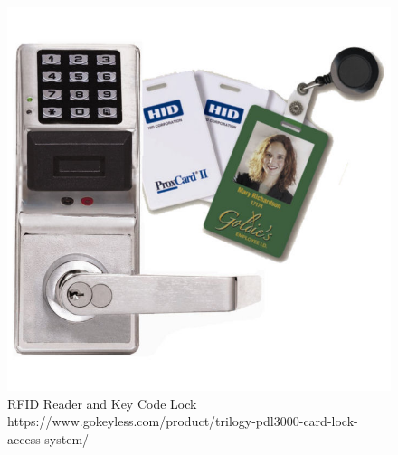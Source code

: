 \documentclass[12pt]{article}
\begin{document}
\begin{figure}[H]
   \centering
   	\captionsetup{justification=centering}
       \includegraphics{figures/lock.jpg}
 \caption{RFID Reader and Key Code Lock https://www.gokeyless.com/product/trilogy-pdl3000-card-lock-access-system/}
 \label{fig:Lock}
\end{figure}
\end{document}
